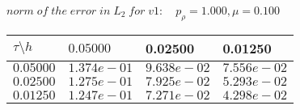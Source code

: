 
 $norm\;of\;the\;error\;in\;L_2\;for\;v1: \quad p_{\rho}=1.000, \mu = 0.100 $ \\ 
\begin{tabular}{|p{0.6in}|p{1.2in}|p{1.2in}|p{1.2in}|} \hline
$\tau\setminus h$ & $0.05000 $ & 0.02500 & 0.01250 \\ \hline
$0.05000$ & $1.374e-01$ &$9.638e-02$ &$7.556e-02$  \\ \hline
$0.02500$ & $1.275e-01$ &$7.925e-02$ &$5.293e-02$  \\ \hline
$0.01250$ & $1.247e-01$ &$7.271e-02$ &$4.298e-02$  \\ \hline
\end{tabular}\\[20pt]
